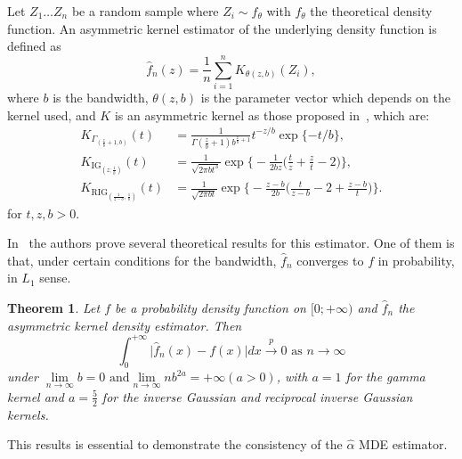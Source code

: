 \documentclass[journal]{IEEEtran}
\numberwithin{equation}{section}
\newtheorem{theorem}{Theorem}[section]
\begin{document}
Let $Z_1 \ldots Z_n$ be a random sample where $Z_i \sim f_{\theta}$ with $f_{\theta}$ the theoretical density function. An asymmetric kernel estimator of the underlying density function is defined as 
\begin{equation}
\widehat{f}_n(z)=\frac{1}{n}\sum_{i=1}^n K_{\theta(z,b)}(Z_i),
\label{fn}
\end{equation}
where  $b$ is the bandwidth, ${\theta}(z,b)$ is the parameter vector which depends on the kernel used, and $K$ is an asymmetric kernel  as those proposed in~\cite{bouezmarni2005}, which are: 
\begin{align}
K_{\Gamma_{\left(\frac{z}{b}+1,b\right)}}(t) & =\frac{1}{\Gamma(\frac{z}{b}+1)b^{\frac{z}{b}+1}} t^{-{z}/{b}} \exp\{-{t}/{b}\},
\label{gammakernel}\\
K_{\text{IG}_{\left( z;\frac{1}{b}\right)}}(t) & =\frac{1}{\sqrt{2\pi b t^3}} 
\exp\Big\{-\frac{1}{2b z} \Big(\frac{t}{z}+\frac{z}{t}-2\Big)\Big\},
\label{IGkernel}\\
K_{\text{RIG}_{\left(\frac{1}{z-b},\frac{1}{b}\right)}}(t) & =\frac{1}{\sqrt{2\pi b t}} 
\exp\Big\{-\frac{z-b}{2b} \Big(\frac{t}{z-b}-2+\frac{z-b}{t}\Big)\Big\}.
\label{RIGkernel}
\end{align}
for $t,z,b>0$.

In~\cite{bouezmarni2005} the authors prove several theoretical results for this estimator. 
One of them is that, under certain conditions for the bandwidth, $\widehat{f}_n$ converges to $f$  in probability, in $L_1$ sense.


\begin{theorem}
	Let $f$ be a probability density function on $[0;+\infty)$ and $\widehat{f}_n$ the asymmetric kernel density estimator. Then
	\begin{equation}
	\int_0^{+\infty} \vert \widehat{f}_n(x)-f(x)\vert dx \stackrel{p} {\longrightarrow} 0 \text{ as } n \longrightarrow \infty
	\label{L1}
	\end{equation}
	under $\lim\limits_{n \to \infty} b = 0 \text{ and} \lim\limits_{n \to \infty} n b^{2a} = +\infty (a > 0)$, with $a = 1$ for the gamma kernel and $a = \frac{5}{2}$ for the
	inverse Gaussian and reciprocal inverse Gaussian kernels.
\end{theorem}

This results is essential to demonstrate the consistency of the $\widehat{\alpha}$ MDE estimator.
\end{document}
